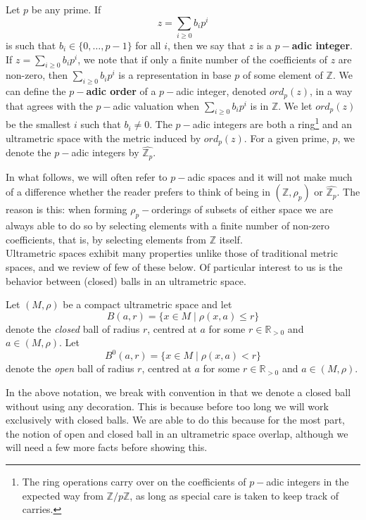 \begin{example}
Let $p$ be any prime. If 
\[z = \sum_{i \geq 0} b_ip^i\]
is such that $b_i \in \{0,\ldots,p-1\}$ for all $i$, then we say that $z$ is a \textbf{$p-$adic integer}. If $z = \sum_{i \geq 0} b_ip^i$, we note that if only a finite number of the coefficients of $z$ are non-zero, then $\sum_{i \geq 0} b_ip^i$ is a representation in base $p$ of some element of $\mathbb{Z}$. We can define the \textbf{$p-$adic order} of a $p-$adic integer, denoted $ord_p(z)$, in a way that agrees with the $p-$adic valuation when $\sum_{i \geq 0} b_ip^i$ is in $\mathbb{Z}$. We let $ord_p(z)$ be the smallest $i$ such that $b_i \neq 0$. The $p-$adic integers are both a ring\footnote{The ring operations carry over on the coefficients of $p-$adic integers in the expected way from $\mathbb{Z}/p\mathbb{Z}$, as long as special care is taken to keep track of carries.} and an ultrametric space with the metric induced by $ord_p(z)$. For a given prime, $p$, we denote the $p-$adic integers by $\widehat{\mathbb{Z}_p}$.
\end{example} 

In what follows, we will often refer to $p-$adic spaces and it will not make much of a difference whether the reader prefers to think of being in $(\mathbb{Z}, \rho_p)$ or $\widehat{\mathbb{Z}_p}$. The reason is this: when forming $\rho_p-$orderings of subsets of either space we are always able to do so by selecting elements with a finite number of non-zero coefficients, that is, by selecting elements from $\mathbb{Z}$ itself. \\

Ultrametric spaces exhibit many properties unlike those of traditional metric spaces, and we review of few of these below. Of particular interest to us is the behavior between (closed) balls in an ultrametric space. \\

\begin{notation*}
	Let $(M, \rho)$ be a compact ultrametric space and let \[B(a, r)=\{x \in M \mid \rho(x,a) \leq r\}\] denote the \textit{closed} ball of radius $r$, centred at $a$ for some $r \in \mathbb{R}_{> 0}$ and $a \in (M,\rho)$. Let \[B^0(a, r)=\{x \in M \mid \rho(x,a) < r\}\] denote the \textit{open} ball of radius $r$, centred at $a$ for some $r \in \mathbb{R}_{> 0}$ and $a \in (M,\rho)$.
\end{notation*} 


In the above notation, we break with  convention in that we denote a closed ball without using any decoration. This is because before too long we will work exclusively with closed balls.  We are able to do this because for the most part, the notion of open and closed ball in an ultrametric space overlap, although we will need a few more facts before showing this.\\

